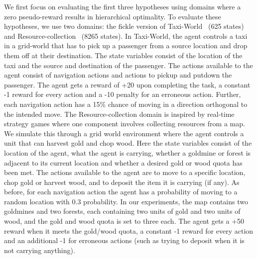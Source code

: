 We first focus on evaluating the first three hypotheses using domains
where a zero pseudo-reward results in hierarchical optimality. To
evaluate these hypotheses, we use two domains: the 
fickle version of {\sf Taxi-World}~\cite{d-hrl-00} (625 states) and {\sf
  Resource-collection}~\cite{mehta.icml08} (8265 states). In {\sf Taxi-World}, the
agent controls a taxi in a grid-world that has to pick up a passenger
from a source location and drop them off at their destination. The
state variables consist of the location of the taxi and the source and
destination of the passenger. The actions available to the agent
consist of navigation actions and actions to pickup and putdown the
passenger.  The agent gets a reward of +20 upon completing the task, a
constant -1 reward for every action and a -10 penalty for an erroneous
action. Further, each navigation action has a 15\% chance of moving in
a direction orthogonal to the intended move. The {\sf
  Resource-collection} domain is inspired by real-time strategy games
where one component involves collecting resources from a map. We
simulate this through a grid world environment where the agent
controls a unit that can harvest gold and chop wood. Here the state
variables consist of the location of the agent, what the agent is
carrying, whether a goldmine or forest is adjacent to its current
location and whether a desired gold or wood quota has been met. The
actions available to the agent are to move to a specific location,
chop gold or harvest wood, and to deposit the item it is carrying (if
any). 
As before, for each navigation action the agent has a
probability of moving to a random location with 0.3 probability. 
In our experiments, the map contains two
goldmines and two forests, each containing two units of gold and two
units of wood, and the gold and wood quota is set to three each. The
agent gets a +50 reward when it meets the gold/wood quota, a constant
-1 reward for every action and an additional -1 for erroneous actions
(such as trying to deposit when it is not carrying anything).

